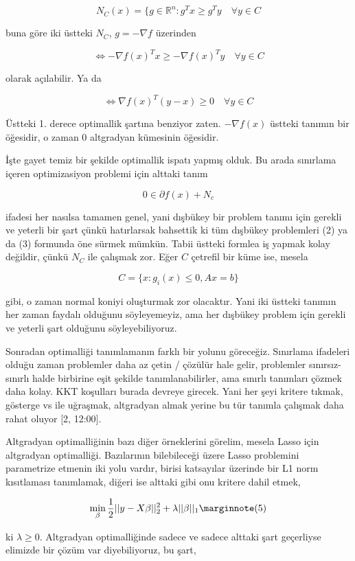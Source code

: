 \documentclass[12pt,fleqn]{article}\usepackage{../../common}
\begin{document}
$$
N_C(x) = \{ g \in \mathbb{R}^n: g^T x \ge g^T y \quad \forall y \in C
$$

buna göre iki üstteki $N_C$, $g=-\nabla f$ üzerinden

$$
\iff -\nabla f(x)^T x \ge -\nabla f(x)^T y \quad \forall y \in C
$$

olarak açılabilir. Ya da

$$
\iff \nabla f(x)^T(y-x) \ge 0 \quad \forall y \in C
$$

Üstteki 1. derece optimallik şartına benziyor zaten. $-\nabla f(x)$ üstteki
tanımın bir öğesidir, o zaman 0 altgradyan kümesinin öğesidir. 

İşte gayet temiz bir şekilde optimallik ispatı yapmış olduk. Bu arada
sınırlama içeren optimizasiyon problemi için alttaki tanım

$$
0 \in \partial f(x) + N_c
$$

ifadesi her nasılsa tamamen genel, yani dışbükey bir problem tanımı için
gerekli ve yeterli bir şart çünkü hatırlarsak bahsettik ki tüm dışbükey
problemleri (2) ya da (3) formunda öne sürmek mümkün. Tabii üstteki formlea
iş yapmak kolay değildir, çünkü $N_C$ ile çalışmak zor. Eğer $C$ çetrefil
bir küme ise, mesela

$$
C = \{ x: g_i(x) \le 0, Ax = b \}
$$

gibi, o zaman normal koniyi oluşturmak zor olacaktır. Yani iki üstteki
tanımın her zaman faydalı olduğunu söyleyemeyiz, ama her dışbükey problem
için gerekli ve yeterli şart olduğunu söyleyebiliyoruz.

Sonradan optimalliği tanımlamanın farklı bir yolunu göreceğiz. Sınırlama
ifadeleri olduğu zaman problemler daha az çetin / çözülür hale gelir,
problemler sınırsız-sınırlı halde birbirine eşit şekilde tanımlanabilirler,
ama sınırlı tanımları çözmek daha kolay. KKT koşulları burada devreye
girecek.  Yani her şeyi kritere tıkmak, gösterge vs ile uğraşmak,
altgradyan almak yerine bu tür tanımla çalışmak daha rahat oluyor [2, 12:00].

Altgradyan optimalliğinin bazı diğer örneklerini görelim, mesela Lasso
için altgradyan optimalliği. Bazılarının bilebileceği üzere Lasso
problemini parametrize etmenin iki yolu vardır, birisi katsayılar üzerinde
bir L1 norm kısıtlaması tanımlamak, diğeri ise alttaki gibi onu kritere
dahil etmek, 

$$
\min_\beta \frac{1}{2} || y - X \beta ||_2^2 + \lambda ||\beta||_1
\mlabel{5}
$$

ki $\lambda \ge 0$. Altgradyan optimalliğinde sadece ve sadece alttaki şart
geçerliyse elimizde bir çözüm var diyebiliyoruz, bu şart, 
\end{document}
